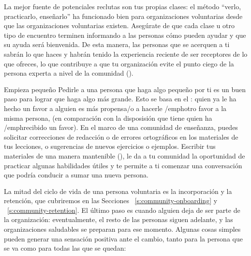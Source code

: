 La mejor fuente de potenciales reclutas son tus propias clases:
el método ``verlo, practicarlo, enseñarlo'' ha funcionado bien para organizaciones voluntarias
desde que las organizaciones voluntarias existen.
Asegúrate de que cada clase u otro tipo de encuentro
terminen informando a las personas cómo pueden ayudar y que su ayuda será bienvenida.
De esta manera, las personas que se acerquen a ti sabrán lo que haces
y habrán tenido la experiencia reciente de ser receptores de lo que ofreces,
lo que contribuye a que tu organización evite el punto ciego de la persona experta a nivel de la comunidad ().

\begin{aside}{Empieza pequeño}
  Pedirle a una persona que haga algo pequeño por ti
  es un buen paso para lograr que haga algo más grande. Esto se basa en el :
  quien ya le ha hecho un favor a alguien es más propensa/o
  a hacerle /emph{otro} favor a la misma persona,
  (en comparación con la disposisión que tiene quien ha /emph{recibido} un favor).
  En el marco de una comunidad de enseñanza, 
  puedes solicitar correcciones de redacción o de errores ortográficos en los materiales de tus lecciones,
  o sugerencias de nuevos ejercicios o ejemplos.
  Escribir tus materiales de una manera mantenible (),
  le da a tu comunidad la oportunidad de practicar algunas habilidades útiles
  y te permite a ti comenzar una conversación
  que podría conducir a sumar una nueva persona.
\end{aside}


La mitad del ciclo de vida de una persona voluntaria es la incorporación y la retención,
que cubriremos en las Secciones ~\ref{s:community-onboarding} y ~\ref{s:community-retention}.
El último paso es cuando alguien deja de ser parte de la organización:
eventualmente, el resto de las personas siguen adelante,
y las organizaciones saludables se preparan para ese momento.
Algunas cosas simples pueden generar una sensación positiva ante el cambio, tanto para la persona que se va como para todas las que se quedan:


